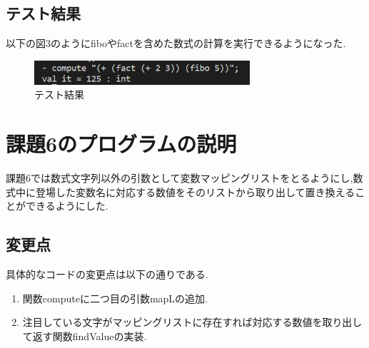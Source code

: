 \documentclass[dvipdfmx]{jarticle}
\begin{document}
\subsection{テスト結果}
以下の図3のようにfiboやfactを含めた数式の計算を実行できるようになった.
\begin{figure}[h]
    \centering
    \includegraphics[width=8cm]{test4.png}
    \caption{テスト結果}
\end{figure}
\section{課題6のプログラムの説明}
課題6では数式文字列以外の引数として変数マッピングリストをとるようにし,数式中に登場した変数名に対応する数値をそのリストから取り出して置き換えることができるようにした.
\subsection{変更点}
具体的なコードの変更点は以下の通りである.
\begin{enumerate}
    \item 関数computeに二つ目の引数mapLの追加.
    \item 注目している文字がマッピングリストに存在すれば対応する数値を取り出して返す関数findValueの実装.
\end{enumerate}
\end{document}
